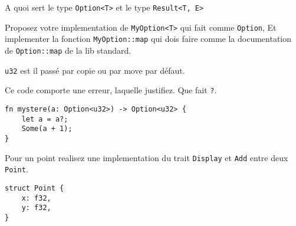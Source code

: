 \documentclass[11pt,a4paper,addpoint]{exam}
\begin{document}
\begin{questions}

\question[1] A quoi sert le type \texttt{Option<T>} et le type \texttt{Result<T, E>}
\vspace{1in}



\question[1] Proposez votre implementation de \texttt{MyOption<T>} qui fait comme \texttt{Option},
Et implementer la fonction \texttt{MyOption::map} qui dois faire comme la documentation de \texttt{Option::map}
de la lib standard.
\vspace{3in}

\question[1] \texttt{u32} est il passé par copie ou par move par défaut. 
\vspace{1in}

\question[1] Ce code comporte une erreur, laquelle justifiez. Que fait \texttt{?}.
\begin{verbatim}
fn mystere(a: Option<u32>) -> Option<u32> {
    let a = a?;
    Some(a + 1);
}
\end{verbatim}
\vspace{1.5in}

\question[1] Pour un point realisez une implementation du trait \texttt{Display} et \texttt{Add} entre deux \texttt{Point}.
\begin{verbatim}
struct Point {
    x: f32,
    y: f32,
}















\end{verbatim}
\end{questions}
\end{document}
